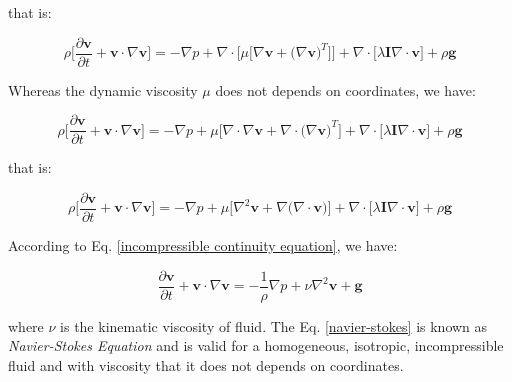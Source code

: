 \medskip
\noindent
that is:

\begin{equation} 
 \rho \Bigg[ \frac{\partial \textbf{v}}{\partial t} + \textbf{v} \cdot \nabla \textbf{v} \Bigg]
 =
 -
 \nabla p
 +
 \nabla \cdot \big[ \mu \big[ \nabla \textbf{v} + \big( \nabla \textbf{v} \big)^{T} \big] \big]
 + 
 \nabla \cdot \big[ \lambda \textbf{I} \nabla \cdot \textbf{v} \big]
 +
 \rho \textbf{g}
\end{equation}


\medskip
\noindent
Whereas the dynamic viscosity $\mu$ does not depends on coordinates,
we have:

\begin{equation} 
 \rho \Bigg[ \frac{\partial \textbf{v}}{\partial t} + \textbf{v} \cdot \nabla \textbf{v} \Bigg]
 =
 -
 \nabla p
 +
 \mu \big[ \nabla \cdot \nabla \textbf{v} + \nabla \cdot \big( \nabla \textbf{v} \big)^{T} \big]
 +
 \nabla \cdot \big[ \lambda \textbf{I} \nabla \cdot \textbf{v} \big]
 +
 \rho \textbf{g}
\end{equation}

\medskip
\noindent
that is:

\begin{equation} 
 \rho \Bigg[ \frac{\partial \textbf{v}}{\partial t} + \textbf{v} \cdot \nabla \textbf{v} \Bigg]
 =
 -
 \nabla p
 +
 \mu \big[ \nabla^{2} \textbf{v} + \nabla \big( \nabla \cdot \textbf{v} \big) \big]
 +
 \nabla \cdot \big[ \lambda \textbf{I} \nabla \cdot \textbf{v} \big]
 +
 \rho \textbf{g}
\end{equation}

\medskip
\noindent
According to Eq. \ref{incompressible continuity equation}, we have:

\begin{equation} \label{navier-stokes}
 \frac{\partial \textbf{v}}{\partial t} + \textbf{v} \cdot \nabla \textbf{v}
 =
 -
 \frac{1}{\rho} \nabla p
 +
 \nu \nabla^{2} \textbf{v}
 +
 \textbf{g}
\end{equation}

\medskip
\noindent
where $\nu$ is the kinematic viscosity of fluid.
 The Eq. \ref{navier-stokes} is known as
\textit{Navier-Stokes Equation} and is valid for a
homogeneous, isotropic, incompressible fluid
and with viscosity that it does not depends on coordinates.

\newpage

